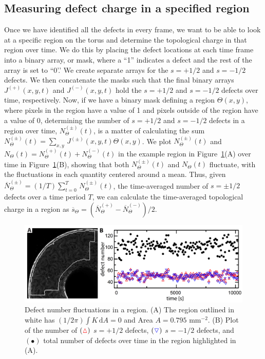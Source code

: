 \subsection{Measuring defect charge in a specified region}
Once we have identified all the defects in every frame, we want to be able to look at a specific region on the torus and determine the topological charge in that region over time.
We do this by placing the defect locations at each time frame into a binary array, or mask, where a ``1'' indicates a defect and the rest of the array is set to ``0'.'
We create separate arrays for the $s = + 1/2$ and $s = - 1/2$ defects.
We then concatenate the masks such that the final binary arrays $J^{(+)}(x,y,t)$ and $J^{(-)}(x,y,t)$ hold the $s = +1/2$ and $s = -1/2$ defects over time, respectively.
Now, if we have a binary mask defining a region $\Theta(x,y)$, where pixels in the region have a value of 1 and pixels outside of the region have a value of $0$, determining the number of $s = +1/2$ and $s = -1/2$ defects in a region over time, $N^{(\pm)}_{\Theta}(t)$, is a matter of calculating the sum $N^{(\pm)}_{\Theta}(t) = \sum\limits_{x,y}\,J^{(\pm)}(x,y,t)\Theta(x,y)$.
We plot $N^{(\pm)}_{\Theta}(t)$ and $N_{\Theta}(t) = N^{(+)}_{\Theta}(t) + N^{(-)}_{\Theta}(t)$ in the example region in Figure~\ref{f:3-NumberOverTime}(A) over time in Figure~\ref{f:3-NumberOverTime}(B), showing that both $N^{(\pm)}_{\Theta}(t)$ and $N_{\Theta}(t)$ fluctuate, with the fluctuations in each quantity centered around a mean.
Thus, given $\overbar{N}^{(\pm)}_{\Theta} = (1/T)\sum\limits_{t = 0}^T \, N^{(\pm)}_{\Theta}(t)$, the time-averaged number of $s = \pm 1/2$ defects over a time period $T$, we can calculate the time-averaged topological charge in a region as $\overbar{s}_{\Theta} = (\overbar{N}^{(+)}_{\Theta} - \overbar{N}^{(-)}_{\Theta})/2$.
\begin{figure}
  \centering
  \includegraphics{figures/C3/Ch3-Figs_NumberOverTime.png}
  \caption{Defect number fluctuations in a region.
  (A) The region outlined in white has $(1/2\pi)\int K\, \textrm{d}A = 0$ and Area $A = 0.795$ mm$^{-2}$.
  (B) Plot of the number of $({\color{red} \vartriangle})$ $s = + 1/2$ defects, $({\color{blue} \triangledown})$ $s = -1/2$ defects, and $(\bullet)$ total number of defects over time in the region highlighted in (A).}\label{f:3-NumberOverTime}
\end{figure}

